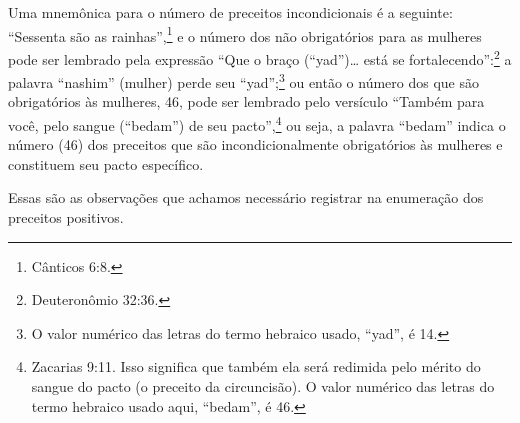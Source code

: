 Uma mnemônica para o número de preceitos incondicionais é a seguinte: ``Sessenta são as rainhas'',\footnote{Cânticos 6:8.} e o número dos não obrigatórios para as mulheres pode ser lembrado pela expressão ``Que o braço (``yad'')\ldots{} está se fortalecendo'':\footnote{Deuteronômio 32:36.} a palavra ``nashim'' (mulher)
perde seu ``yad'';\footnote{O valor numérico das letras do termo hebraico usado, ``yad'', é 14.} ou então o número dos que são
obrigatórios às mulheres, 46, pode ser lembrado pelo versículo ``Também para você, pelo sangue (``bedam'') de seu pacto'',\footnote{Zacarias 9:11. Isso significa que também ela será redimida pelo mérito do sangue do
  pacto (o preceito da circuncisão). O valor numérico das letras do
  termo hebraico usado aqui, ``bedam'', é 46.} ou seja, a
palavra ``bedam'' indica o número (46) dos preceitos que são incondicionalmente obrigatórios às mulheres e constituem seu pacto específico.

Essas são as observações que achamos necessário registrar na enumeração
dos preceitos positivos.

